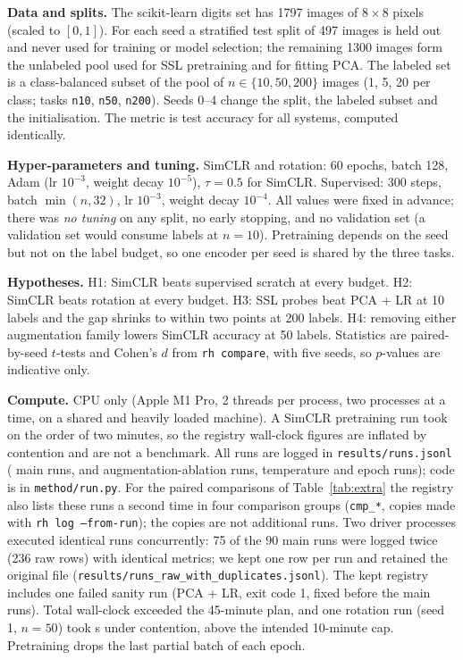 \textbf{Data and splits.} The scikit-learn digits set has 1797 images of $8\times8$ pixels (scaled to $[0,1]$). For each seed a stratified test split of 497 images is held out and never used for training or model selection; the remaining 1300 images form the unlabeled pool used for SSL pretraining and for fitting PCA. The labeled set is a class-balanced subset of the pool of $n\in\{10,50,200\}$ images (1, 5, 20 per class; tasks \texttt{n10}, \texttt{n50}, \texttt{n200}). Seeds 0--4 change the split, the labeled subset and the initialisation. The metric is test accuracy for all systems, computed identically.

\textbf{Hyper-parameters and tuning.} SimCLR and rotation: 60 epochs, batch 128, Adam (lr $10^{-3}$, weight decay $10^{-5}$), $\tau=0.5$ for SimCLR. Supervised: 300 steps, batch $\min(n,32)$, lr $10^{-3}$, weight decay $10^{-4}$. All values were fixed in advance; there was \emph{no tuning} on any split, no early stopping, and no validation set (a validation set would consume labels at $n=10$). Pretraining depends on the seed but not on the label budget, so one encoder per seed is shared by the three tasks.

\textbf{Hypotheses.} H1: SimCLR beats supervised scratch at every budget. H2: SimCLR beats rotation at every budget. H3: SSL probes beat PCA + LR at 10 labels and the gap shrinks to within two points at 200 labels. H4: removing either augmentation family lowers SimCLR accuracy at 50 labels. Statistics are paired-by-seed $t$-tests and Cohen's $d$ from \texttt{rh compare}, with five seeds, so $p$-values are indicative only.

\textbf{Compute.} CPU only (Apple M1 Pro, 2 threads per process, two processes at a time, on a shared and heavily loaded machine). A SimCLR pretraining run took on the order of two minutes, so the registry wall-clock figures are inflated by contention and are not a benchmark. All runs are logged in \texttt{results/runs.jsonl} ( main runs,  and  augmentation-ablation runs,  temperature and  epoch runs); code is in \texttt{method/run.py}. For the paired comparisons of Table~\ref{tab:extra} the registry also lists these runs a second time in four comparison groups (\texttt{cmp\_*}, copies made with \texttt{rh log --from-run}); the copies are not additional runs. Two driver processes executed identical runs concurrently: 75 of the 90 main runs were logged twice (236 raw rows) with identical metrics; we kept one row per run and retained the original file (\texttt{results/runs\_raw\_with\_duplicates.jsonl}). The kept registry includes one failed sanity run (PCA + LR, exit code 1, fixed before the main runs). Total wall-clock exceeded the 45-minute plan, and one rotation run (seed 1, $n=50$) took  s under contention, above the intended 10-minute cap. Pretraining drops the last partial batch of each epoch.
